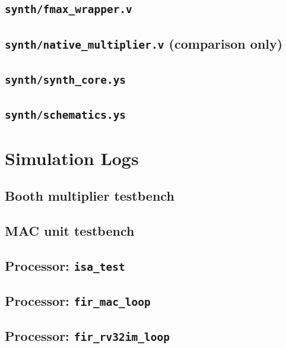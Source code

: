\documentclass[11pt,a4paper]{report}
\newcommand{\code}[1]{\texttt{#1}}
\begin{document}
\section{\code{synth/fmax\_wrapper.v}}


\section{\code{synth/native\_multiplier.v} (comparison only)}


\section{\code{synth/synth\_core.ys}}


\section{\code{synth/schematics.ys}}


\chapter{Simulation Logs}\label{app:log}

\section{Booth multiplier testbench}


\section{MAC unit testbench}


\section{Processor: \code{isa\_test}}


\section{Processor: \code{fir\_mac\_loop}}


\section{Processor: \code{fir\_rv32im\_loop}}

\end{document}
